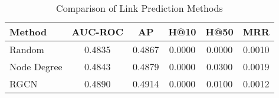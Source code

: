 \begin{table}[htbp]
\centering
\caption{Comparison of Link Prediction Methods}
\label{tab:method_comparison}
\begin{tabular}{lccccc}
\hline
Method & AUC-ROC & AP & H@10 & H@50 & MRR \\
\hline
Random & 0.4835 & 0.4867 & 0.0000 & 0.0000 & 0.0010 \\
Node Degree & 0.4843 & 0.4879 & 0.0000 & 0.0300 & 0.0019 \\
RGCN & 0.4890 & 0.4914 & 0.0000 & 0.0100 & 0.0012 \\
\hline
\end{tabular}
\end{table}